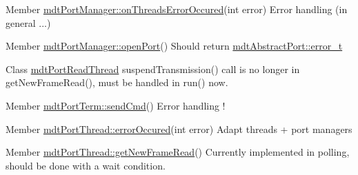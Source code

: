 \label{todo__todo000023}
\hypertarget{todo__todo000023}{}
 
\begin{DoxyDescription}
\item[Member \hyperlink{classmdt_port_manager_a7e45b8e3475e5182ed12218616664d07}{mdtPortManager::onThreadsErrorOccured}(int error) ]Error handling (in general ...) 
\end{DoxyDescription}

\label{todo__todo000024}
\hypertarget{todo__todo000024}{}
 
\begin{DoxyDescription}
\item[Member \hyperlink{classmdt_port_manager_aab594613e8985590c835194efbc27b5e}{mdtPortManager::openPort}() ]Should return \hyperlink{classmdt_abstract_port_ad4121bb930c95887e77f8bafa065a85e}{mdtAbstractPort::error\_\-t} 
\end{DoxyDescription}

\label{todo__todo000025}
\hypertarget{todo__todo000025}{}
 
\begin{DoxyDescription}
\item[Class \hyperlink{classmdt_port_read_thread}{mdtPortReadThread} ]suspendTransmission() call is no longer in getNewFrameRead(), must be handled in run() now. 
\end{DoxyDescription}

\label{todo__todo000052}
\hypertarget{todo__todo000052}{}
 
\begin{DoxyDescription}
\item[Member \hyperlink{classmdt_port_term_a7ec568c44f862fe7aee83f1a271ac6bb}{mdtPortTerm::sendCmd}() ]Error handling ! 
\end{DoxyDescription}

\label{todo__todo000027}
\hypertarget{todo__todo000027}{}
 
\begin{DoxyDescription}
\item[Member \hyperlink{classmdt_port_thread_ab31cbe1a85aa830cd368654d1f806326}{mdtPortThread::errorOccured}(int error) ]Adapt threads + port managers
\end{DoxyDescription}

\label{todo__todo000028}
\hypertarget{todo__todo000028}{}
 
\begin{DoxyDescription}
\item[Member \hyperlink{classmdt_port_thread_a611211e56620ec9c699019452716e4fc}{mdtPortThread::getNewFrameRead}() ]Currently implemented in polling, should be done with a wait condition.
\end{DoxyDescription}

